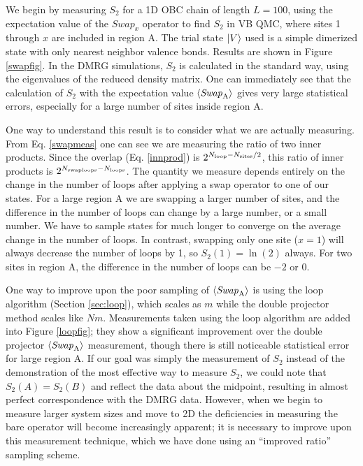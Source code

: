 We begin by measuring $S_2$ for a 1D OBC chain of length $L=100$, using the expectation value of the $Swap_x$ operator to find $S_2$ in VB QMC, where sites 1 through $x$ are included in region A. 
The trial state $\lvert {V} \rangle$ used is a simple dimerized state with only nearest neighbor valence bonds.
Results are shown in Figure \ref{swapfig}.
In the DMRG simulations, $S_2$ is calculated in the standard way, using the eigenvalues of the reduced density matrix. 
One can immediately see that the calculation of $S_2$ with the expectation value $\langle {\it Swap}_{\rm A} \rangle$ gives very large statistical errors, especially for a large number of sites inside region A.

One way to understand this result is to consider what we are actually measuring.
From Eq. \eqref{swapmeas} one can see we are measuring the ratio of two inner products.
Since the overlap (Eq. \eqref{innprod}) is $2^{N_{\rm loop} - N_{\rm sites}/2}$, this ratio of inner products is $2^{N_{\rm swaploops} - N_{\rm loops}}$.
The quantity we measure depends entirely on the change in the number of loops after applying a swap operator to one of our states. 
For a large region A we are swapping a larger number of sites, and the difference in the number of loops can change by a large number, or a small number. 
We have to sample states for much longer to converge on the average change in the number of loops.
In contrast, swapping only one site ($x=1$) will always decrease the number of loops by 1, so $S_2(1)=\ln(2)$ always.
For two sites in region A, the difference in the number of loops can be $-2$ or 0.


One way to improve upon the poor sampling of  $\langle {\it Swap}_{\rm A} \rangle$ is using the loop algorithm (Section \ref{sec:loop}), which scales as $m$ while the double projector method scales like $Nm$.
Measurements taken using the loop algorithm are added into Figure \ref{loopfig}; they show a significant improvement over the double projector $\langle {\it Swap}_{\rm A} \rangle$ measurement, 
though there is still noticeable statistical error for large region A.
If our goal was simply the measurement of $S_2$ instead of the demonstration of the most effective way to measure $S_2$, we could note that $S_2(A) = S_2(B)$ and reflect the data about the midpoint, resulting in almost perfect correspondence with the DMRG data.
However, when we begin to measure larger system sizes and move to 2D the deficiencies in measuring the bare \swa operator will become increasingly apparent; it is necessary to improve upon this measurement technique, which we have done using an ``improved ratio'' sampling scheme.




